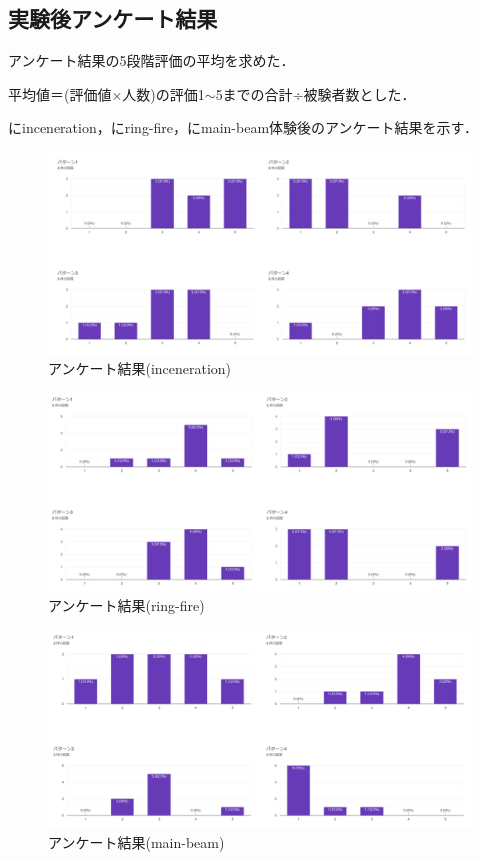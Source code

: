 \subsection{実験後アンケート結果}
アンケート結果の5段階評価の平均を求めた．

平均値＝{(評価値×人数)の評価1$\sim$5までの合計}÷被験者数とした．

にinceneration，にring-fire，にmain-beam体験後のアンケート結果を示す．

\begin{figure}[h]
  \centering
  \includegraphics[clip,width=14cm]{./fig/incenerationAnk.png}
  \caption{アンケート結果(inceneration)}\label{inceAnk}
  \end{figure}

\begin{figure}[h]
  \centering
  \includegraphics[clip,width=14cm]{fig/ringfireAnk.png}
  \caption{アンケート結果(ring-fire)}\label{ringAnk}
  \end{figure}

\newpage

\begin{figure}[h]
  \centering
  \includegraphics[clip,width=14cm]{fig/mainbeamAnk.png}
  \caption{アンケート結果(main-beam)}\label{mainAnk}
  \end{figure}
  


